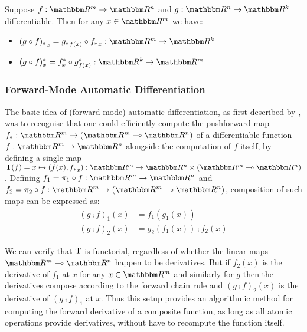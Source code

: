 \begin{proposition}
Suppose $f: \RR^m \to \RR^n$ and $g: \RR^n \to \RR^k$ differentiable. Then for any $x \in \RR^m$ we have:

\begin{itemize}
\item $\pushf{(g \comp f)}_x = \pushf{g}_{f(x)} \comp \pushf{f}_x: \RR^m \to \RR^k$
\item $\pullf{(g \comp f)}_x = \pullf{f}_{x} \comp \pullf{g}_{f(x)}: \RR^k \to \RR^m$
\end{itemize}
\end{proposition}

\subsubsection{Forward-Mode Automatic Differentiation}

The basic idea of (forward-mode) automatic differentiation, as first described by \citet{linnainmaa76}, was to
recognise that one could efficiently compute the pushforward map $\pushf{f}: \RR^m \to (\RR^m \linearto
\RR^n)$ of a differentiable function $f: \RR^m \to \RR^n$ alongside the computation of $f$ itself, by defining
a single map $\tangents(f) = x \mapsto (f(x), \pushf{f}_x): \RR^m \to \RR^n \times (\RR^m \linearto \RR^n)$.
Defining $f_1 = \pi_1 \comp f: \RR^m \to \RR^n$ and $f_2 = \pi_2 \comp f: \RR^m \to (\RR^m \linearto \RR^n)$,
composition of such maps can be expressed as:
\begin{align*}
(g \comp f)_1(x) &= f_1(g_1(x)) \\
(g \comp f)_2(x) &= g_2(f_1(x)) \comp f_2(x)
\end{align*}

We can verify that $\mathrm{T}$ is functorial, regardless of whether the linear maps $\RR^m \linearto \RR^n$
happen to be derivatives. But if $f_2(x)$ is the derivative of $f_1$ at $x$ for any $x \in \RR^m$ and
similarly for $g$ then the derivatives compose according to the forward chain rule and $(g \comp f)_2(x)$ is
the derivative of $(g \comp f)_1$ at $x$. Thus this setup provides an algorithmic method for computing the
forward derivative of a composite function, as long as all atomic operations provide derivatives, without have
to recompute the function itself.


